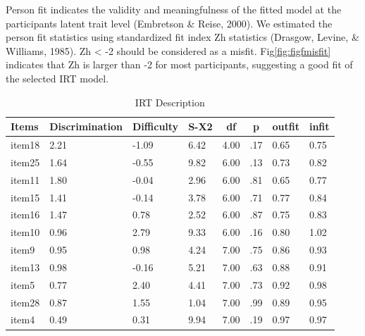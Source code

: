 \documentclass[
  man]{apa6}
\begin{document}
Person fit indicates the validity and meaningfulness of the fitted model at the participants latent trait level (Embretson \& Reise, 2000). We estimated the person fit statistics using standardized fit index Zh statistics (Drasgow, Levine, \& Williams, 1985). Zh \textless{} -2 should be considered as a misfit. Fig\ref{fig:figfmisfit} indicates that Zh is larger than -2 for most participants, suggesting a good fit of the selected IRT model.

\begin{table}[tbp]

\begin{center}
\begin{threeparttable}

\caption{\label{tab:tabIRT}IRT Description}

\begin{tabular}{llllllll}
\toprule
Items & \multicolumn{1}{c}{Discrimination} & \multicolumn{1}{c}{Difficulty} & \multicolumn{1}{c}{S-X2} & \multicolumn{1}{c}{df} & \multicolumn{1}{c}{p} & \multicolumn{1}{c}{outfit} & \multicolumn{1}{c}{infit}\\
\midrule
item18 & 2.21 & -1.09 & 6.42 & 4.00 & .17 & 0.65 & 0.75\\
item25 & 1.64 & -0.55 & 9.82 & 6.00 & .13 & 0.73 & 0.82\\
item11 & 1.80 & -0.04 & 2.96 & 6.00 & .81 & 0.65 & 0.77\\
item15 & 1.41 & -0.14 & 3.78 & 6.00 & .71 & 0.77 & 0.84\\
item16 & 1.47 & 0.78 & 2.52 & 6.00 & .87 & 0.75 & 0.83\\
item10 & 0.96 & 2.79 & 9.33 & 6.00 & .16 & 0.80 & 1.02\\
item9 & 0.95 & 0.98 & 4.24 & 7.00 & .75 & 0.86 & 0.93\\
item13 & 0.98 & -0.16 & 5.21 & 7.00 & .63 & 0.88 & 0.91\\
item5 & 0.77 & 2.40 & 4.41 & 7.00 & .73 & 0.92 & 0.98\\
item28 & 0.87 & 1.55 & 1.04 & 7.00 & .99 & 0.89 & 0.95\\
item4 & 0.49 & 0.31 & 9.94 & 7.00 & .19 & 0.97 & 0.97\\
\bottomrule
\end{tabular}

\end{threeparttable}
\end{center}

\end{table}
\end{document}
